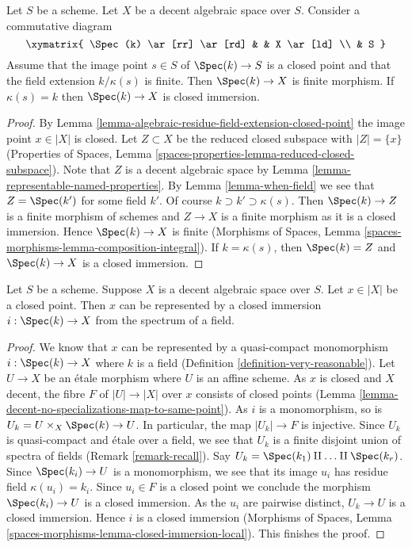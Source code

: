 \begin{lemma}
\label{lemma-finite-residue-field-extension-finite}
Let $S$ be a scheme. Let $X$ be a decent algebraic space over $S$.
Consider a commutative diagram
$$
\xymatrix{
\Spec(k) \ar[rr] \ar[rd] & & X \ar[ld] \\
& S
}
$$
Assume that the image point $s \in S$ of $\Spec(k) \to S$ is
a closed point and that the field extension $k/\kappa(s)$ is finite.
Then $\Spec(k) \to X$ is finite morphism. If $\kappa(s) = k$
then $\Spec(k) \to X$ is closed immersion.
\end{lemma}

\begin{proof}
By Lemma \ref{lemma-algebraic-residue-field-extension-closed-point}
the image point $x \in |X|$ is closed. Let $Z \subset X$ be the
reduced closed subspace with $|Z| = \{x\}$ (Properties of Spaces,
Lemma \ref{spaces-properties-lemma-reduced-closed-subspace}).
Note that $Z$ is a decent algebraic space by
Lemma \ref{lemma-representable-named-properties}.
By Lemma \ref{lemma-when-field} we see that $Z = \Spec(k')$
for some field $k'$. Of course $k \supset k' \supset \kappa(s)$.
Then $\Spec(k) \to Z$ is a finite morphism of schemes
and $Z \to X$ is a finite morphism as it is a closed immersion.
Hence $\Spec(k) \to X$ is finite (Morphisms of Spaces, Lemma
\ref{spaces-morphisms-lemma-composition-integral}).
If $k = \kappa(s)$, then $\Spec(k) = Z$ and $\Spec(k) \to X$
is a closed immersion.
\end{proof}

\begin{lemma}
\label{lemma-decent-space-closed-point}
Let $S$ be a scheme. Suppose $X$ is a decent algebraic space over $S$.
Let $x \in |X|$ be a closed point. Then $x$ can be represented by a
closed immersion $i : \Spec(k) \to X$ from the spectrum of a field.
\end{lemma}

\begin{proof}
We know that $x$ can be represented by a quasi-compact monomorphism
$i : \Spec(k) \to X$ where $k$ is a field
(Definition \ref{definition-very-reasonable}).
Let $U \to X$ be an \'etale morphism where $U$ is an affine scheme.
As $x$ is closed and $X$ decent, the fibre $F$ of $|U| \to |X|$ over $x$
consists of closed points
(Lemma \ref{lemma-decent-no-specializations-map-to-same-point}).
As $i$ is a monomorphism, so is $U_k = U \times_X \Spec(k) \to U$.
In particular, the map $|U_k| \to F$ is injective. Since $U_k$
is quasi-compact and \'etale over a field, we see that $U_k$ is a
finite disjoint union of spectra of fields (Remark \ref{remark-recall}).
Say $U_k = \Spec(k_1) \amalg \ldots \amalg \Spec(k_r)$.
Since $\Spec(k_i) \to U$ is a monomorphism, we see that
its image $u_i$ has residue field $\kappa(u_i) = k_i$.
Since $u_i \in F$ is a closed point we conclude the morphism
$\Spec(k_i) \to U$ is a closed immersion. As the $u_i$ are pairwise distinct,
$U_k \to U$ is a closed immersion. Hence $i$ is a closed immersion
(Morphisms of Spaces, Lemma
\ref{spaces-morphisms-lemma-closed-immersion-local}). This finishes the proof.
\end{proof}





